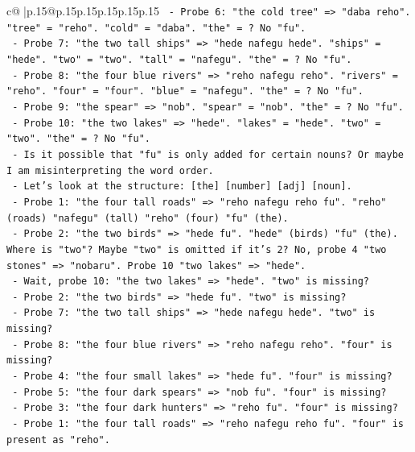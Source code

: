 \documentclass{article}
\begin{document}
{\begin{supertabular}{c@{$\;$}|p{.15\linewidth}@{}p{.15\linewidth}p{.15\linewidth}p{.15\linewidth}p{.15\linewidth}p{.15\linewidth}}
{{{\texttt{        {-} Probe 6: "the cold tree" => "daba reho". "tree" = "reho". "cold" = "daba". "the" = ? No "fu".} \\
\texttt{        {-} Probe 7: "the two tall ships" => "hede nafegu hede". "ships" = "hede". "two" = "two". "tall" = "nafegu". "the" = ? No "fu".} \\
\texttt{        {-} Probe 8: "the four blue rivers" => "reho nafegu reho". "rivers" = "reho". "four" = "four". "blue" = "nafegu". "the" = ? No "fu".} \\
\texttt{        {-} Probe 9: "the spear" => "nob". "spear" = "nob". "the" = ? No "fu".} \\
\texttt{        {-} Probe 10: "the two lakes" => "hede". "lakes" = "hede". "two" = "two". "the" = ? No "fu".} \\
\texttt{        {-} Is it possible that "fu" is only added for certain nouns? Or maybe I am misinterpreting the word order.} \\
\texttt{        {-} Let's look at the structure: {[}the{]} {[}number{]} {[}adj{]} {[}noun{]}.} \\
\texttt{        {-} Probe 1: "the four tall roads" => "reho nafegu reho fu". "reho" (roads) "nafegu" (tall) "reho" (four) "fu" (the).} \\
\texttt{        {-} Probe 2: "the two birds" => "hede fu". "hede" (birds) "fu" (the). Where is "two"? Maybe "two" is omitted if it's 2? No, probe 4 "two stones" => "nobaru". Probe 10 "two lakes" => "hede".} \\
\texttt{        {-} Wait, probe 10: "the two lakes" => "hede". "two" is missing?} \\
\texttt{        {-} Probe 2: "the two birds" => "hede fu". "two" is missing?} \\
\texttt{        {-} Probe 7: "the two tall ships" => "hede nafegu hede". "two" is missing?} \\
\texttt{        {-} Probe 8: "the four blue rivers" => "reho nafegu reho". "four" is missing?} \\
\texttt{        {-} Probe 4: "the four small lakes" => "hede fu". "four" is missing?} \\
\texttt{        {-} Probe 5: "the four dark spears" => "nob fu". "four" is missing?} \\
\texttt{        {-} Probe 3: "the four dark hunters" => "reho fu". "four" is missing?} \\
\texttt{        {-} Probe 1: "the four tall roads" => "reho nafegu reho fu". "four" is present as "reho".} \\
}}}
\end{supertabular}}
\end{document}
